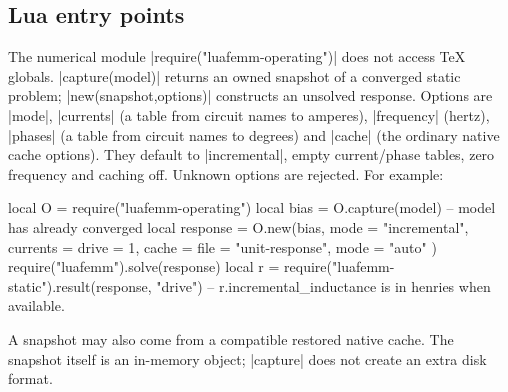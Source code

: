 \subsection{Lua entry points}
The numerical module |require("luafemm-operating")| does not access TeX globals.
|capture(model)| returns an owned snapshot of a converged static problem;
|new(snapshot,options)| constructs an unsolved response. Options are |mode|,
|currents| (a table from circuit names to amperes), |frequency| (hertz),
|phases| (a table from circuit names to degrees) and |cache| (the ordinary
native cache options). They default to |incremental|, empty current/phase tables,
zero frequency and caching off. Unknown options are rejected. For example:
\begin{codeexample}
local O = require("luafemm-operating")
local bias = O.capture(model) -- model has already converged
local response = O.new(bias, {
  mode = "incremental", currents = {drive = 1},
  cache = {file = "unit-response", mode = "auto"}
})
require("luafemm").solve(response)
local r = require("luafemm-static").result(response, "drive")
-- r.incremental_inductance is in henries when available.
\end{codeexample}
A snapshot may also come from a compatible restored native cache. The snapshot
itself is an in-memory object; |capture| does not create an extra disk format.
